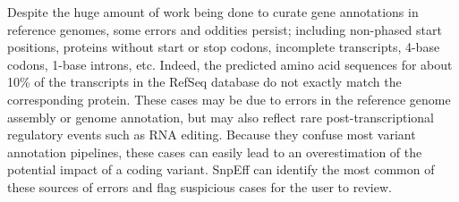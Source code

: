 \begin{framed}
Despite the huge amount of work being done to curate gene annotations in reference genomes, some errors and oddities persist; including non-phased start positions, proteins without start or stop codons, incomplete transcripts, 4-base codons, 1-base introns, etc. Indeed, the predicted amino acid sequences for about 10\% of the transcripts in the RefSeq database do not exactly match the corresponding protein. These cases may be due to errors in the reference genome assembly or genome annotation, but may also reflect rare post-transcriptional regulatory events such as RNA editing. Because they confuse most variant annotation pipelines, these cases can easily lead to an overestimation of the potential impact of a coding variant. SnpEff can identify the most common of these sources of errors and flag suspicious cases for the user to review.
\end{framed}


